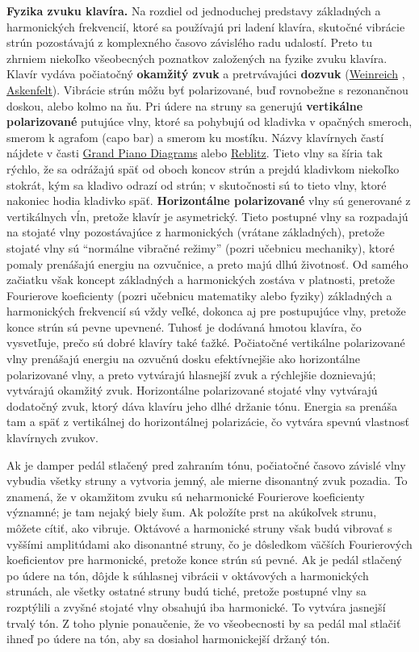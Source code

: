 \documentclass[11pt,a4paper]{book}
\begin{document}
\textbf{Fyzika zvuku klavíra.} Na rozdiel od jednoduchej predstavy základných a harmonických frekvencií, ktoré sa používajú pri ladení klavíra, skutočné vibrácie strún pozostávajú z komplexného časovo závislého radu udalostí. Preto tu zhrniem niekoľko všeobecných poznatkov založených na fyzike zvuku klavíra. Klavír vydáva počiatočný \textbf{okamžitý zvuk} a pretrvávajúci \textbf{dozvuk} (\hyperlink{r:weinreich}{Weinreich} , \hyperlink{r:askenfelt}{Askenfelt}). Vibrácie strún môžu byť polarizované, buď rovnobežne s rezonančnou doskou, alebo kolmo na ňu. Pri údere na struny sa generujú \textbf{vertikálne polarizované} putujúce vlny, ktoré sa pohybujú od kladivka v opačných smeroch, smerom k agrafom (capo bar) a smerom ku mostíku. Názvy klavírnych častí nájdete v časti \href{http://www.piano.christophersmit.com/stringing.html}{Grand Piano Diagrams} alebo \href{http://www.pianopractice.org/FOPP3Ed.html\#doc125}{Reblitz}. Tieto vlny sa šíria tak rýchlo, že sa odrážajú späť od oboch koncov strún a prejdú kladivkom niekoľko stokrát, kým sa kladivo odrazí od strún; v skutočnosti sú to tieto vlny, ktoré nakoniec hodia kladivko späť. \textbf{Horizontálne polarizované} vlny sú generované z vertikálnych vĺn, pretože klavír je asymetrický. Tieto postupné vlny sa rozpadajú na stojaté vlny pozostávajúce z harmonických (vrátane základných), pretože stojaté vlny sú “normálne vibračné režimy” (pozri učebnicu mechaniky), ktoré pomaly prenášajú energiu na ozvučnice, a preto majú dlhú životnosť. Od samého začiatku však koncept základných a harmonických zostáva v platnosti, pretože Fourierove koeficienty (pozri učebnicu matematiky alebo fyziky) základných a harmonických frekvencií sú vždy veľké, dokonca aj pre postupujúce vlny, pretože konce strún sú pevne upevnené. Tuhosť je dodávaná hmotou klavíra, čo vysvetľuje, prečo sú dobré klavíry také ťažké. Počiatočné vertikálne polarizované vlny prenášajú energiu na ozvučnú dosku efektívnejšie ako horizontálne polarizované vlny, a preto vytvárajú hlasnejší zvuk a rýchlejšie doznievajú; vytvárajú okamžitý zvuk. Horizontálne polarizované stojaté vlny vytvárajú dodatočný zvuk, ktorý dáva klavíru jeho dlhé držanie tónu. Energia sa prenáša tam a späť z vertikálnej do horizontálnej polarizácie, čo vytvára spevnú vlastnosť klavírnych zvukov.

Ak je damper pedál stlačený pred zahraním tónu, počiatočné časovo závislé vlny vybudia všetky struny a vytvoria jemný, ale mierne disonantný zvuk pozadia. To znamená, že v okamžitom zvuku sú neharmonické Fourierove koeficienty významné; je tam nejaký biely šum. Ak položíte prst na akúkoľvek strunu, môžete cítiť, ako vibruje. Oktávové a harmonické struny však budú vibrovať s vyššími amplitúdami ako disonantné struny, čo je dôsledkom väčších Fourierových koeficientov pre harmonické, pretože konce strún sú pevné. Ak je pedál stlačený po údere na tón, dôjde k súhlasnej vibrácii v oktávových a harmonických strunách, ale všetky ostatné struny budú tiché, pretože postupné vlny sa rozptýlili a zvyšné stojaté vlny obsahujú iba harmonické. To vytvára jasnejší trvalý tón. Z toho plynie ponaučenie, že vo všeobecnosti by sa pedál mal stlačiť ihneď po údere na tón, aby sa dosiahol harmonickejší držaný tón.
\end{document}
